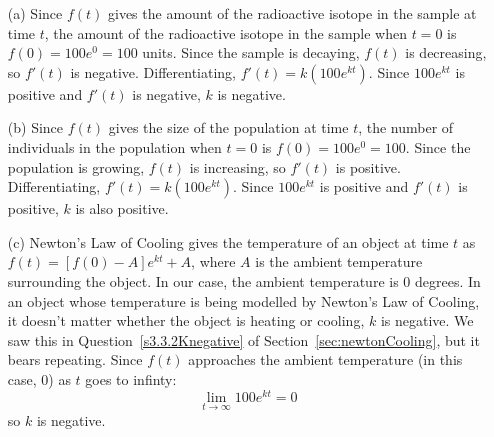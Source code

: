 \begin{solution}
\begin{itemize}
\item[(a)] Since $f(t)$ gives the amount of  the radioactive isotope in the sample at time $t$, the amount of the radioactive isotope in the sample when $t=0$ is $f(0)=100e^0=100$ units. Since the sample is decaying,  $f(t)$ is decreasing, so $f'(t)$ is negative. Differentiating, $f'(t)=k(100e^{kt})$. Since $100e^{kt}$ is positive and $f'(t)$ is negative, $k$ is negative.
\item[(b)] Since $f(t)$ gives the size of the population at time $t$, the number of individuals in the population when $t=0$ is $f(0)=100e^0=100$. Since the population is growing,  $f(t)$ is increasing, so $f'(t)$ is positive. Differentiating, $f'(t)=k(100e^{kt})$. Since $100e^{kt}$ is positive and $f'(t)$ is positive, $k$ is also positive.
\item[(c)] Newton's Law of Cooling gives the temperature of an object at time $t$ as
$f(t)=[f(0)-A]e^{kt}+A$, where $A$ is the ambient temperature surrounding the object. In our case, the ambient temperature is 0 degrees. In an object whose temperature is being modelled by Newton's Law of Cooling,  it doesn't matter whether the object is heating or cooling, $k$ is negative. We saw this in Question~\ref{s3.3.2Knegative} of Section~\ref*{sec:newtonCooling}, %
 but it bears repeating. Since $f(t)$ approaches the ambient temperature (in this case, 0) as $t$ goes to infinty:
\[\lim_{t \to \infty}100e^{kt}=0\]
so $k$ is negative.
\end{itemize}
\end{solution}
